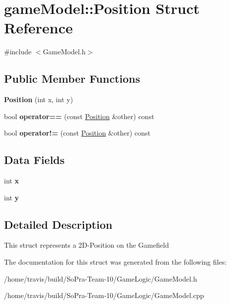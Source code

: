 \hypertarget{structgame_model_1_1_position}{\section{game\-Model\-:\-:Position Struct Reference}
\label{structgame_model_1_1_position}
}


{\ttfamily \#include $<$Game\-Model.\-h$>$}

\subsection*{Public Member Functions}
\begin{DoxyCompactItemize}
\item 
\hypertarget{structgame_model_1_1_position_adb34a80ed89108f40a0d642fdbdd4e44}{{\bfseries Position} (int x, int y)}\label{structgame_model_1_1_position_adb34a80ed89108f40a0d642fdbdd4e44}

\item 
\hypertarget{structgame_model_1_1_position_aa2d124ca5ef188d18a71dac9620c8113}{bool {\bfseries operator==} (const \hyperlink{structgame_model_1_1_position}{Position} \&other) const }\label{structgame_model_1_1_position_aa2d124ca5ef188d18a71dac9620c8113}

\item 
\hypertarget{structgame_model_1_1_position_a8517d6cf475cc8110f81036caf60dde9}{bool {\bfseries operator!=} (const \hyperlink{structgame_model_1_1_position}{Position} \&other) const }\label{structgame_model_1_1_position_a8517d6cf475cc8110f81036caf60dde9}

\end{DoxyCompactItemize}
\subsection*{Data Fields}
\begin{DoxyCompactItemize}
\item 
\hypertarget{structgame_model_1_1_position_a8b8c016c29a18d0c6a8668498f063845}{int {\bfseries x}}\label{structgame_model_1_1_position_a8b8c016c29a18d0c6a8668498f063845}

\item 
\hypertarget{structgame_model_1_1_position_ac17e5a319be555282b38655ee00a6e07}{int {\bfseries y}}\label{structgame_model_1_1_position_ac17e5a319be555282b38655ee00a6e07}

\end{DoxyCompactItemize}


\subsection{Detailed Description}
This struct represents a 2\-D-\/\-Position on the Gamefield 

The documentation for this struct was generated from the following files\-:\begin{DoxyCompactItemize}
\item 
/home/travis/build/\-So\-Pra-\/\-Team-\/10/\-Game\-Logic/Game\-Model.\-h\item 
/home/travis/build/\-So\-Pra-\/\-Team-\/10/\-Game\-Logic/Game\-Model.\-cpp\end{DoxyCompactItemize}
